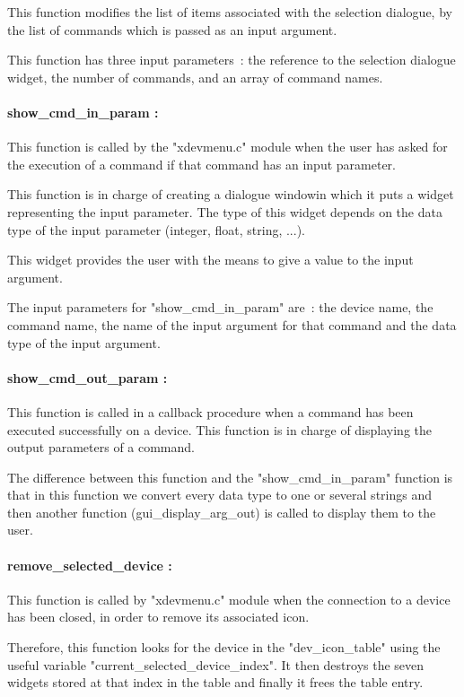 This function modifies the list of items associated
with the selection dialogue, by the list of commands which is passed as an
input argument.

This function has three input parameters~: the reference to the selection
dialogue widget, the number of commands, and an array of command names.


\paragraph{show\_cmd\_in\_param : }

This function is called by the "xdevmenu.c" module when the user has asked
for the execution of a command if that command has an input parameter.

This function is in charge of creating a dialogue window\footnotemark[1]
in which it puts a widget
representing the input parameter. The type of this widget depends on the
data type of the input parameter (integer, float, string, ...).

This widget provides the user with the means to give a value to the input
argument.

The input parameters for "show\_cmd\_in\_param" are~: the device name,
the command name, the name of the input argument for that command and the
data type of the input argument.


\paragraph{show\_cmd\_out\_param : }

This function is called in a callback procedure when a command has been
executed successfully on a device. This function is in charge of displaying
the output parameters of a command.

The difference between this function and the "show\_cmd\_in\_param" function
is that in this function we convert every data type to one or several strings
and then another function (gui\_display\_arg\_out) is called to display them
to the user. 


\paragraph{remove\_selected\_device : }

This function is called by "xdevmenu.c" module when the connection to a device
has been closed, in order to remove its associated icon.

Therefore, this function looks for the device in the "dev\_icon\_table" using
the useful variable "current\_selected\_device\_index". It then destroys the
seven widgets stored at that index in the table and finally it frees the
table entry.


